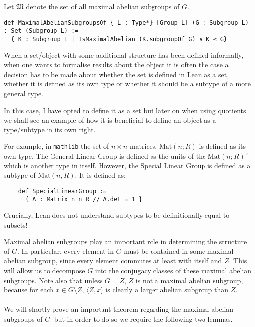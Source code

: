 \begin{definition}
\label{MaximalAbelianSubgroupsOf}
\leanok
Let $\mathfrak{M}$ denote the set of all maximal abelian subgroups of $G$.
\end{definition}
\begin{footnotesize}
\begin{verbatim}
def MaximalAbelianSubgroupsOf { L : Type*} [Group L] (G : Subgroup L) : Set (Subgroup L) :=
  { K : Subgroup L | IsMaximalAbelian (K.subgroupOf G) ∧ K ≤ G}
\end{verbatim}
\end{footnotesize}

\begin{remark}
  When a set/object with some additional structure has been defined informally, when one wants to formalise results about the object it is often the case a decision has to be made
  about whether the set is defined in Lean as a set, whether it is defined as its own type or whether it should be a subtype of a more general type. 
  
  In this case, I have opted to define it as a set but later on when using quotients we shall see an example
  of how it is beneficial to define an object as a type/subtype in its own right.
\end{remark}

\begin{example}
  For example, in \texttt{mathlib} the set of $n \times n$ matrices, $\textrm{Mat}(n; R)$ is defined as its own type. The General Linear Group is defined as the units
  of the $\textrm{Mat}(n; R)^\times$ which is another type in itself. However, the Special Linear Group is defined as a subtype of $\textrm{Mat}(n, R)$. It is defined as:

  \begin{footnotesize}
  \begin{verbatim}
    def SpecialLinearGroup :=  
      { A : Matrix n n R // A.det = 1 }
  \end{verbatim}

  Crucially, Lean does not understand subtypes to be definitionally equal to subsets! 
  \end{footnotesize}
\end{example}

\vspace{3mm}

Maximal abelian subgroups play an important role in determining the structure of $G$. In particular, every element in $G$ must be contained in some maximal abelian subgroup, since every element commutes at least with itself and $Z$. This will allow us to decompose $G$ into the conjugacy classes of these maximal abelian subgroups. Note also that unless $G=Z$, $Z$ is not a maximal abelian subgroup, because for each $x \in G \! \setminus \! Z$, $\langle Z,x \rangle$ is clearly a larger abelian subgroup than $Z$. \\
\\
We will shortly prove an important theorem regarding the maximal abelian subgroups of $G$, but in order to do so we require the following two lemmas. \\

